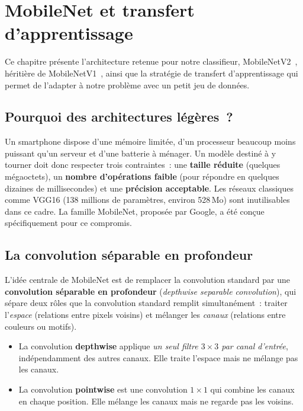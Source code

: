\chapter{MobileNet et transfert d’apprentissage}\label{chap:mobilenet}

Ce chapitre présente l’architecture retenue pour notre classifieur, MobileNetV2~\cite{sandler2018}, héritière de MobileNetV1~\cite{howard2017}, ainsi que la stratégie de transfert d’apprentissage qui permet de l’adapter à notre problème avec un petit jeu de données.

\section{Pourquoi des architectures légères~?}

Un smartphone dispose d’une mémoire limitée, d’un processeur beaucoup moins puissant qu’un serveur et d’une batterie à ménager. Un modèle destiné à y tourner doit donc respecter trois contraintes~: une \textbf{taille réduite} (quelques mégaoctets), un \textbf{nombre d’opérations faible} (pour répondre en quelques dizaines de millisecondes) et une \textbf{précision acceptable}. Les réseaux classiques comme VGG16 (138 millions de paramètres, environ 528\,Mo) sont inutilisables dans ce cadre. La famille MobileNet, proposée par Google, a été conçue spécifiquement pour ce compromis.

\section{La convolution séparable en profondeur}

L’idée centrale de MobileNet est de remplacer la convolution standard par une \textbf{convolution séparable en profondeur} (\emph{depthwise separable convolution}), qui sépare deux rôles que la convolution standard remplit simultanément~: traiter l’\emph{espace} (relations entre pixels voisins) et mélanger les \emph{canaux} (relations entre couleurs ou motifs).

\begin{itemize}
  \item La convolution \textbf{depthwise} applique \emph{un seul filtre $3\times3$ par canal d’entrée}, indépendamment des autres canaux. Elle traite l’espace mais ne mélange pas les canaux.
  \item La convolution \textbf{pointwise} est une convolution $1\times1$ qui combine les canaux en chaque position. Elle mélange les canaux mais ne regarde pas les voisins.
\end{itemize}

